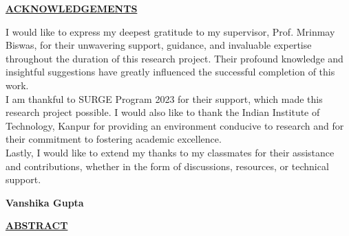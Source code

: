 \documentclass[twoside,final]{hcmut-report}
\begin{document}
\pagebreak

\maketitle

\begin{center}
\vspace{4cm}
\Large\underline{\textbf{ACKNOWLEDGEMENTS}}
\end{center}
\vspace{2cm}



I would like to express my deepest gratitude to my supervisor, Prof. Mrinmay Biswas, for their unwavering support, guidance, and invaluable expertise throughout the duration of this research project. Their profound knowledge and insightful suggestions have greatly influenced the successful completion of this work.\\
I am thankful to SURGE Program 2023 for their support, which made this research project possible. I would also like to thank the Indian Institute of Technology, Kanpur for providing an environment conducive to research and for their commitment to fostering academic excellence.\\
Lastly, I would like to extend my thanks to my classmates for their assistance and contributions, whether in the form of discussions, resources, or technical support.\\
\vspace{3cm}
\begin{flushright}
    \textbf{Vanshika Gupta}
\end{flushright}


\pagebreak

\begin{center}
\vspace{4cm}
\Large\underline{\textbf{ABSTRACT}}
\end{center}
\end{document}
